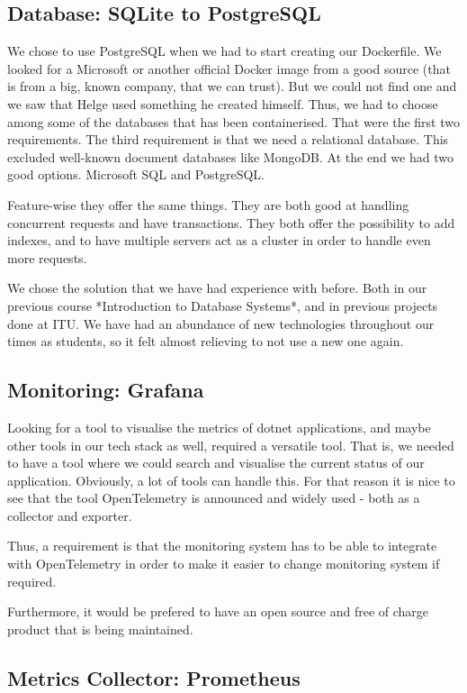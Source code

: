 \subsection{Database: SQLite to PostgreSQL}

We chose to use PostgreSQL when we had to start creating our Dockerfile. We looked for a Microsoft or another official Docker image from a good source (that is from a big, known company, that we can trust). But we could not find one and we saw that Helge used something he created himself. Thus, we had to choose among some of the databases that has been containerised. That were the first two requirements. The third requirement is that we need a relational database. This excluded well-known document databases like MongoDB. At the end we had two good options. Microsoft SQL and PostgreSQL.

Feature-wise they offer the same things. They are both good at handling concurrent requests and have transactions. They both offer the possibility to add indexes, and to have multiple servers act as a cluster in order to handle even more requests.

We chose the solution that we have had experience with before. Both in our previous course *Introduction to Database Systems*, and in previous projects done at ITU. We have had an abundance of new technologies throughout our times as students, so it felt almost relieving to not use a new one again.

\subsection{Monitoring: Grafana}

Looking for a tool to visualise the metrics of dotnet applications, and maybe other tools in our tech stack as well, required a versatile tool. That is, we needed to have a tool where we could search and visualise the current status of our application. Obviously, a lot of tools can handle this. For that reason it is nice to see that the tool OpenTelemetry is announced and widely used - both as a collector and exporter.

Thus, a requirement is that the monitoring system has to be able to integrate with OpenTelemetry in order to make it easier to change monitoring system if required.

Furthermore, it would be prefered to have an open source and free of charge product that is being maintained.

\subsection{Metrics Collector: Prometheus}

